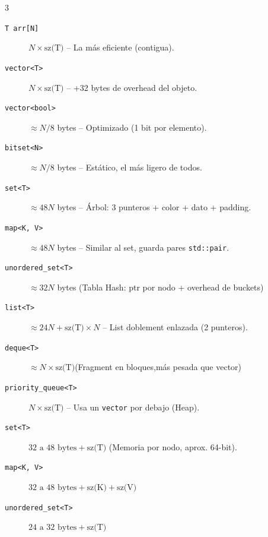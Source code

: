 \documentclass[8pt, spanish, mexico, letterpaper]{extarticle}
\newcommand{\<}{<}
\begin{document}
\begin{multicols*}{3}
\begin{description}
    \item[\texttt{T arr[N]}] $N \times \text{sz(T)}$ -- La más eficiente (contigua).
    \item[\texttt{vector<T>}] $N \times \text{sz(T)}$ -- +32 bytes de overhead del objeto.
    \item[\texttt{vector<bool>}] $\approx N / 8$ bytes -- Optimizado (1 bit por elemento).
    \item[\texttt{bitset<N>}] $\approx N / 8$ bytes -- Estático, el más ligero de todos.
    \item[\texttt{set<T>}] $\approx 48N$ bytes -- Árbol: 3 punteros + color + dato + padding.
    \item[\texttt{map<K, V>}] $\approx 48N$ bytes -- Similar al set, guarda pares \texttt{std::pair}.
    \item[\texttt{unordered\_set<T>}] $\approx 32N$ bytes (Tabla Hash: ptr por nodo + overhead de buckets)
    \item[\texttt{list<T>}] $\approx 24N + \text{sz(T)} \times N$ -- List doblement enlazada (2 punteros).
    \item[\texttt{deque<T>}] $\approx N \times \text{sz(T)}$(Fragment en bloques,más pesada que vector)
    \item[\texttt{priority\_queue<T>}] $N \times \text{sz(T)}$ -- Usa un \texttt{vector} por debajo (Heap).
    \item[\texttt{set<T>}] $32 \text{ a } 48 \text{ bytes} + \text{sz(T)}$ (Memoria por nodo, aprox. 64-bit).
    \item[\texttt{map<K, V>}] $32 \text{ a } 48 \text{ bytes} + \text{sz(K)} + \text{sz(V)}$ 
    \item[\texttt{unordered\_set<T>}] $24 \text{ a } 32 \text{ bytes} + \text{sz(T)}$ 
\end{description}



\end{multicols*}
\end{document}
